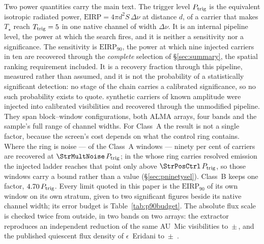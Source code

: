 Two power quantities carry the main text. The trigger level $P_{\rm
trig}$ is the equivalent isotropic radiated power,
$\mathrm{EIRP}=4\pi d^{2}S\,\Delta\nu$ at distance $d$, of a carrier that
makes $T_\star$ reach $T_{\rm trig}=5$ in one native channel
of width $\Delta\nu$. It is an internal pipeline level, the power at
which the search fires, and it is neither a sensitivity nor a
significance. The sensitivity is $\mathrm{EIRP}_{90}$, the power at which
nine injected carriers in ten are recovered through the \emph{complete}
selection of \S\ref{sec:summary}, the spatial ranking requirement included.
It is a recovery fraction through this pipeline, measured rather than
assumed, and it is not the probability of a statistically significant
detection: no stage of the chain carries a calibrated significance, so no
such probability exists to quote. \SelNTone{} synthetic carriers of known
amplitude were injected into calibrated visibilities and recovered
through the unmodified pipeline. They span \SelNUnit{} block--window
configurations, both ALMA arrays, four bands and the sample's full range
of channel widths. For Class~A the result is not a single factor, because
the screen's cost depends on what the control ring contains. Where the ring
is noise --- \StrNNoiseWin{} of the \NWinA{} Class~A windows --- ninety per
cent of carriers are recovered at $\StrMultNoise\,P_{\rm trig}$; in the
\StrNDiscWin{} whose ring carries resolved emission the injected ladder
reaches that point only above $\StrPosCtrl\,P_{\rm trig}$, so those windows
carry a bound rather than a value (\S\ref{sec:pninetysel}). Class~B keeps
one factor, $4.70\,P_{\rm trig}$. Every limit quoted in this
paper is the $\mathrm{EIRP}_{90}$ of its own window on its own stratum,
given to two significant figures beside its native channel width; its error
budget is Table~\ref{tab:p90budget}. The absolute flux scale is checked twice from
outside, in two bands on two arrays: the extractor reproduces an
independent reduction of the same AU~Mic visibilities to
\PxJanRatio\,$\pm$\,\PxJanRatioErr, and the published quiescent flux
density of $\epsilon$~Eridani to \PxEpsRatio\,$\pm$\,\PxEpsRatioErr{}
\citep{Burton2022}.

